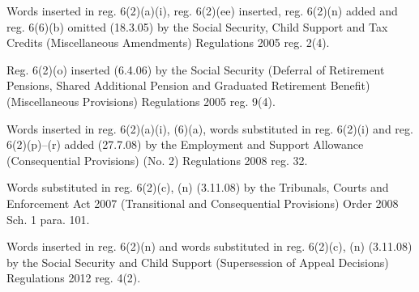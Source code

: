 \documentclass[12pt,a4paper]{article}
\begin{document}
{Words inserted in reg. 6(2)(a)(i), reg. 6(2)(ee) inserted, reg. 6(2)(n) added and reg. 6(6)(b) omitted (18.3.05) by the Social Security, Child Support and Tax Credits (Miscellaneous Amendments) Regulations 2005 reg. 2(4).

Reg. 6(2)(o) inserted (6.4.06) by the Social Security (Deferral of Retirement Pensions, Shared Additional Pension and Graduated Retirement Benefit) (Miscellaneous Provisions) Regulations 2005 reg. 9(4).

\begin{sloppypar}
Words inserted in reg. 6(2)(a)(i), (6)(a), words substituted in reg. 6(2)(i) and reg. 6(2)(p)--(r) added (27.7.08) by the Employment and Support Allowance (Consequential Provisions) (No. 2) Regulations 2008 reg. 32.
\end{sloppypar}

Words substituted in reg. 6(2)(c), (n) (3.11.08) by the Tribunals, Courts and Enforcement Act 2007 (Transitional and Consequential Provisions) Order 2008 Sch. 1 para. 101.

Words inserted in reg. 6(2)(n) and words substituted in reg. 6(2)(c), (n) (3.11.08) by the Social Security and Child Support (Supersession of Appeal Decisions) Regulations 2012 reg. 4(2).
}
\end{document}
